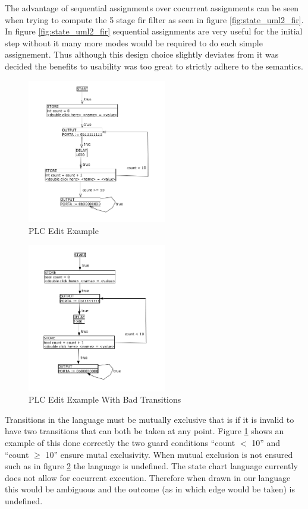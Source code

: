 The advantage of sequential assignments over cocurrent assignments can be seen when trying to compute the 5 stage fir filter as seen in figure \ref{fig:state_uml2_fir}. In figure \ref{fig:state_uml2_fir} sequential assignments are very useful for the initial step without it many more modes would be required to do each simple assignement. Thus although this design choice slightly deviates from \cite{UML2} it was decided the benefits to usability was too great to strictly adhere to the \cite{UML2} semantics.

\begin{figure}[htp]
    \centering
    \includegraphics[width=230px]{./images/tool_transition_example.png}
    \caption{PLC Edit Example}
    \label{fig:tool_transition_example}
\end{figure}

\begin{figure}[htp]
    \centering
    \includegraphics[width=230px]{./images/tool_transition_example_bad.png}
    \caption{PLC Edit Example With Bad Transitions}
    \label{fig:tool_transition_example_bad}
\end{figure}

Transitions in the language must be mutually exclusive that is if it is invalid to have two transitions that can both be taken at any point. Figure \ref{fig:tool_transition_example} shows an example of this done correctly the two guard conditions ``count $<$ 10'' and ``count $\geq$ 10'' ensure mutal exclusivity. When mutual exclusion is not ensured such as in figure \ref{fig:tool_transition_example_bad} the language is undefined. The state chart language currently does not allow for cocurrent execution. Therefore when drawn in our language this would be ambiguous and the outcome (as in which edge would be taken) is undefined.